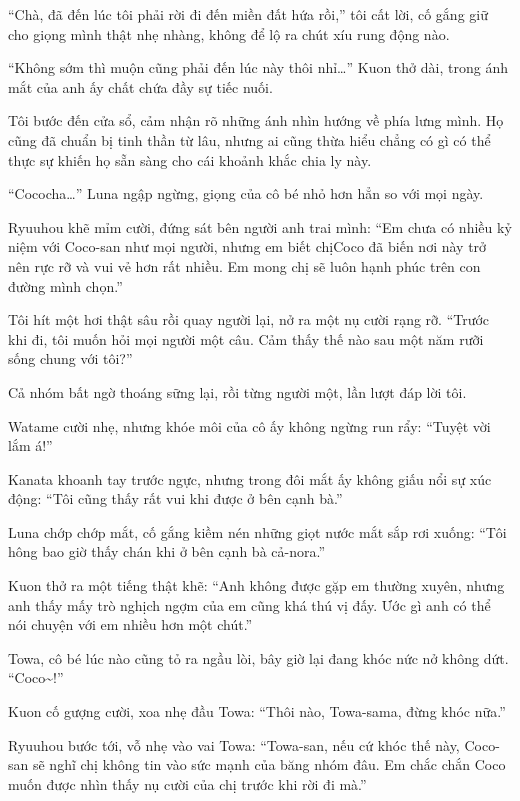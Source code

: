 \documentclass[../main.tex]{subfiles}
\begin{document}
``Chà, đã đến lúc tôi phải rời đi đến miền đất hứa rồi,'' tôi cất lời, cố gắng giữ cho giọng mình thật nhẹ nhàng, không để lộ ra chút xíu rung động nào.

``Không sớm thì muộn cũng phải đến lúc này thôi nhỉ\dots'' Kuon thở dài, trong ánh mắt của anh ấy chất chứa đầy sự tiếc nuối.

Tôi bước đến cửa sổ, cảm nhận rõ những ánh nhìn hướng về phía lưng mình. Họ cũng đã chuẩn bị tinh thần từ lâu, nhưng ai cũng thừa hiểu chẳng có gì có thể thực sự khiến họ sẵn sàng cho cái khoảnh khắc chia ly này.


``Cococha\dots'' Luna ngập ngừng, giọng của cô bé nhỏ hơn hẳn so với mọi ngày.

Ryuuhou khẽ mỉm cười, đứng sát bên người anh trai mình: ``Em chưa có nhiều kỷ niệm với Coco-san như mọi người, nhưng em biết chịCoco đã biến nơi này trở nên rực rỡ và vui vẻ hơn rất nhiều. Em mong chị sẽ luôn hạnh phúc trên con đường mình chọn.''

Tôi hít một hơi thật sâu rồi quay người lại, nở ra một nụ cười rạng rỡ. ``Trước khi đi, tôi muốn hỏi mọi người một câu. Cảm thấy thế nào sau một năm rưỡi sống chung với tôi?''

Cả nhóm bất ngờ thoáng sững lại, rồi từng người một, lần lượt đáp lời tôi.

Watame cười nhẹ, nhưng khóe môi của cô ấy không ngừng run rẩy: ``Tuyệt vời lắm á!''

Kanata khoanh tay trước ngực, nhưng trong đôi mắt ấy không giấu nổi sự xúc động: ``Tôi cũng thấy rất vui khi được ở bên cạnh bà.''

Luna chớp chớp mắt, cố gắng kiềm nén những giọt nước mắt sắp rơi xuống: ``Tôi hông bao giờ thấy chán khi ở bên cạnh bà cả-nora.''

Kuon thở ra một tiếng thật khẽ: ``Anh không được gặp em thường xuyên, nhưng anh thấy mấy trò nghịch ngợm của em cũng khá thú vị đấy. Ước gì anh có thể nói chuyện với em nhiều hơn một chút.''

Towa, cô bé lúc nào cũng tỏ ra ngầu lòi, bây giờ lại đang khóc nức nở không dứt. ``Coco\~{}!''

Kuon cố gượng cười, xoa nhẹ đầu Towa: ``Thôi nào, Towa-sama, đừng khóc nữa.''

Ryuuhou bước tới, vỗ nhẹ vào vai Towa: ``Towa-san, nếu cứ khóc thế này, Coco-san sẽ nghĩ chị không tin vào sức mạnh của băng nhóm đâu. Em chắc chắn Coco muốn được nhìn thấy nụ cười của chị trước khi rời đi mà.''
\end{document}
